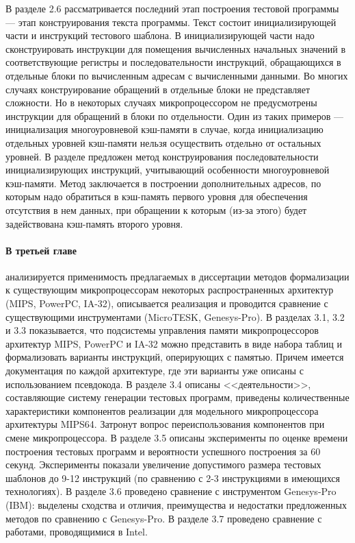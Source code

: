 \documentclass[14pt,autoref,href
,facsimile
]{disser}
\begin{document}
В разделе 2.6 рассматривается последний этап построения тестовой программы --- этап конструирования текста программы. Текст состоит инициализирующей части и инструкций тестового шаблона. В инициализирующей части надо сконструировать инструкции для помещения вычисленных начальных значений в соответствующие регистры и последовательности инструкций, обращающихся в отдельные блоки по вычисленным адресам с вычисленными данными. Во многих случаях конструирование обращений в отдельные блоки не представляет сложности. Но в некоторых случаях микропроцессором не предусмотрены инструкции для обращений в блоки по отдельности. Один из таких примеров --- инициализация многоуровневой кэш-памяти в случае, когда инициализацию отдельных уровней кэш-памяти нельзя осуществить отдельно от остальных уровней. В разделе предложен метод конструирования последовательности инициализирующих инструкций, учитывающий особенности многоуровневой кэш-памяти. Метод заключается в построении дополнительных адресов, по которым надо обратиться в кэш-память первого уровня для обеспечения отсутствия в нем данных, при обращении к которым (из-за этого) будет задействована кэш-память второго уровня.

\paragraph{В третьей главе} анализируется применимость предлагаемых в диссертации методов формализации к существующим микропроцессорам некоторых распространенных архитектур (MIPS, PowerPC, IA-32), описывается реализация и проводится сравнение с существующими инструментами (MicroTESK, Genesys-Pro). В разделах 3.1, 3.2 и 3.3 показывается, что подсистемы управления памяти микропроцессоров архитектур MIPS, PowerPC и IA-32 можно представить в виде набора таблиц и формализовать варианты инструкций, оперирующих с памятью. Причем имеется документация по каждой архитектуре, где эти варианты уже описаны с использованием псевдокода. В разделе 3.4 описаны <<деятельности>>, составляющие систему генерации тестовых программ, приведены количественные характеристики компонентов реализации для модельного микропроцессора архитектуры MIPS64. Затронут вопрос переиспользования компонентов при смене микропроцессора. В разделе 3.5 описаны эксперименты по оценке времени построения тестовых программ и вероятности успешного построения за 60 секунд. Эксперименты показали увеличение допустимого размера тестовых шаблонов до 9-12 инструкций (по сравнению с 2-3 инструкциями в имеющихся технологиях). В разделе 3.6 проведено сравнение с инструментом Genesys-Pro (IBM): выделены сходства и отличия, преимущества и недостатки предложенных методов по сравнению с Genesys-Pro. В разделе 3.7 проведено сравнение с работами, проводящимися в Intel.
\end{document}
